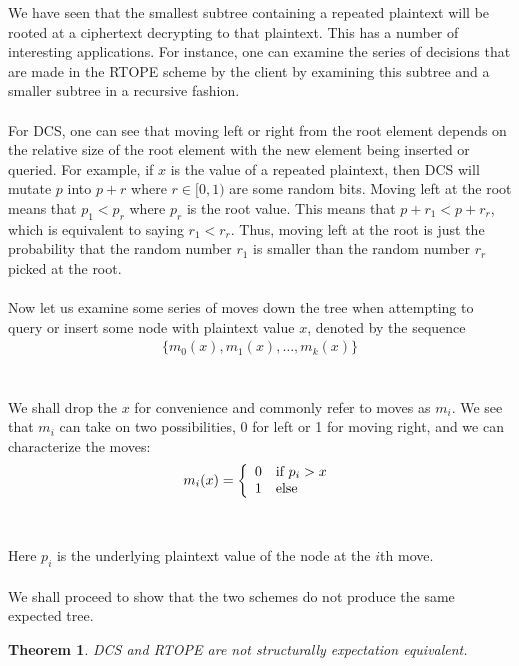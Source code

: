 \documentclass[12pt]{article}
\newtheorem{theorem}{Theorem}
\begin{document}
We have seen that the smallest subtree containing a repeated plaintext will be rooted at a ciphertext decrypting to that plaintext. This has a number of interesting applications. For instance, one can examine the series of decisions that are made in the RTOPE scheme by the client by examining this subtree and a smaller subtree in a recursive fashion. \\ \\
For DCS, one can see that moving left or right from the root element depends on the relative size of the root element with the new element being inserted or queried. For example, if $x$ is the value of a repeated plaintext, then DCS will mutate $p$ into $p + r$ where $r \in [0,1)$ are some random bits. Moving left at the root means that $p_1 < p_r$ where $p_r$ is the root value. This means that $p + r_1 < p + r_r$, which is equivalent to saying $r_1 < r_r$. Thus, moving left at the root is just the probability that the random number $r_1$ is smaller than the random number $r_r$ picked at the root. \\ \\
Now let us examine some series of moves down the tree when attempting to query or insert some node with plaintext value $x$, denoted by the sequence
  \begin{eqnarray}
    \{ m_0(x), m_1(x), \ldots, m_k(x) \}
  \end{eqnarray} \\ \\
We shall drop the $x$ for convenience and commonly refer to moves as $m_i$. We see that $m_i$ can take on two possibilities, 0 for left or 1 for moving right, and we can characterize the moves:
  \begin{eqnarray}
    m_i(x) = \left\{ \begin{array}{l l}
        0 & \textrm{if } p_i > x \\
        1 & \textrm{else}
    \end{array} \right.
  \end{eqnarray}\\ \\
Here $p_i$ is the underlying plaintext value of the node at the $i$th move.\\ \\
We shall proceed to show that the two schemes do not produce the same expected tree. \begin{theorem}
    DCS and RTOPE are not structurally expectation equivalent.
  \end{theorem}
\end{document}
